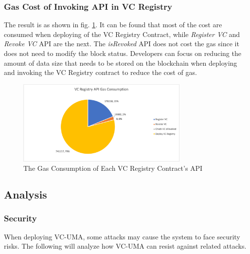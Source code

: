 \documentclass[conference, dvipdfmx]{IEEEtran} %
\begin{document}
\begin{sloppypar}
\subsubsection{Gas Cost of Invoking API in VC Registry}

The result is as shown in fig. \ref{fig:vc_gas_consumption}. It can be found that most of the cost are consumed when deploying of the VC Registry Contract, while \textit{Register VC} and \textit{Revoke VC} API are the next. The \textit{isRevoked} API does not cost the gas since it does not need to modify the block status. 
Developers can focus on reducing the amount of data size that needs to be stored on the blockchain when deploying and invoking the VC Registry contract to reduce the cost of gas.

\begin{figure}[htbp] %
  \begin{center} %
  \includegraphics[width=85mm]{images/exper_fig/vc_gas_consumption.png} %
  \caption{The Gas Consumption of Each VC Registry Contract's API} %
  \label{fig:vc_gas_consumption} %
  \end{center}
\end{figure}


\subsection{Analysis}

\subsubsection{Security}
When deploying VC-UMA, some attacks may cause the system to face security risks. The following will analyze how VC-UMA can resist against related attacks.



\end{sloppypar}
\end{document}

